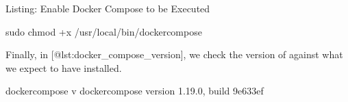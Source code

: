 \documentclass[letterpaper,10pt,english]{sphinxmanual}
\begin{document}
Listing: Enable Docker Compose to be Executed

%
\begin{sphinxVerbatim}[commandchars=\\\{\}]
\PYGZdl{} sudo chmod +x /usr/local/bin/docker\PYGZhy{}compose
\end{sphinxVerbatim}

Finally, in {[}@lst:docker\_compose\_version{]}, we check the version of
 against what we expect to have installed.

%
\begin{sphinxVerbatim}[commandchars=\\\{\}]
\PYGZdl{} docker\PYGZhy{}compose \PYGZhy{}v
docker\PYGZhy{}compose version 1.19.0, build 9e633ef
\end{sphinxVerbatim}
\end{document}
